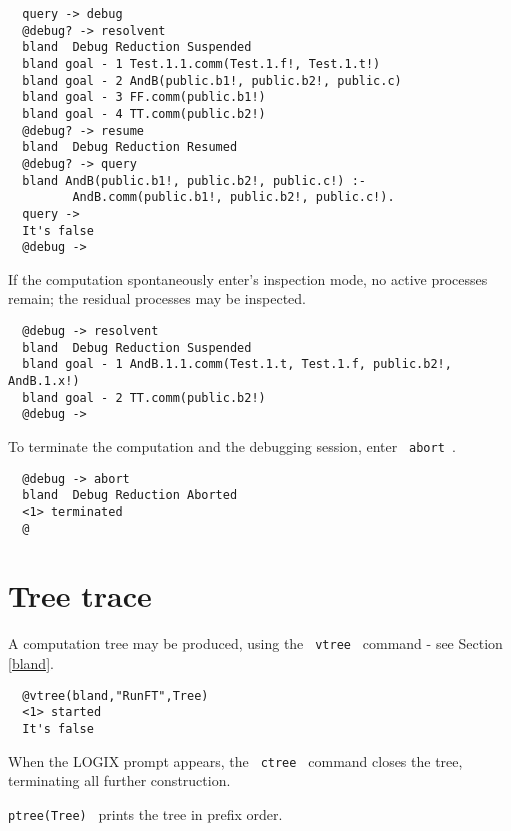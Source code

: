 \begin{verbatim}
  query -> debug
  @debug? -> resolvent
  bland  Debug Reduction Suspended
  bland goal - 1 Test.1.1.comm(Test.1.f!, Test.1.t!)
  bland goal - 2 AndB(public.b1!, public.b2!, public.c)
  bland goal - 3 FF.comm(public.b1!)
  bland goal - 4 TT.comm(public.b2!)
  @debug? -> resume
  bland  Debug Reduction Resumed
  @debug? -> query
  bland AndB(public.b1!, public.b2!, public.c!) :- 
         AndB.comm(public.b1!, public.b2!, public.c!).
  query -> 
  It's false
  @debug ->
\end{verbatim}

\noindent
If the computation spontaneously enter's inspection mode,
no active processes remain; the residual processes may
be inspected.

\begin{verbatim}
  @debug -> resolvent
  bland  Debug Reduction Suspended
  bland goal - 1 AndB.1.1.comm(Test.1.t, Test.1.f, public.b2!, AndB.1.x!)
  bland goal - 2 TT.comm(public.b2!)
  @debug ->
\end{verbatim}

\noindent
To terminate the computation and the debugging session,
enter \verb+ abort +.

\begin{verbatim}
  @debug -> abort
  bland  Debug Reduction Aborted
  <1> terminated
  @
\end{verbatim}

\section{Tree trace}
\label{vtree traces}

A computation tree may be produced, using the \verb+ vtree +
command - see Section \ref{bland}.

\begin{verbatim}
  @vtree(bland,"RunFT",Tree)
  <1> started
  It's false
\end{verbatim}

\noindent
When the LOGIX prompt appears,
the \verb+ ctree + command closes the tree, terminating
all further construction.

\noindent
\verb+ptree(Tree) + prints the tree in prefix order.

